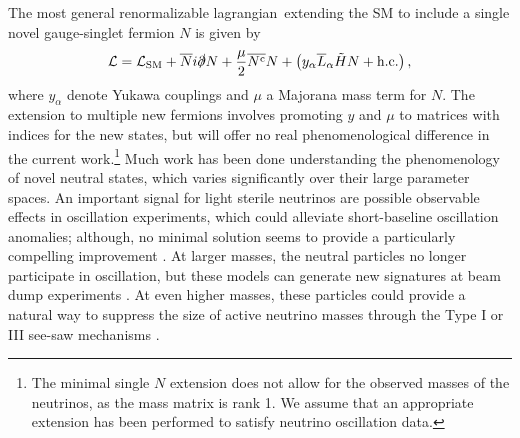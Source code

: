 \documentclass[11pt, a4paper]{article}
\def\lagrangian{lagrangian}
\begin{document}
The most general renormalizable \lagrangian\ extending the SM to include a
single novel gauge-singlet fermion $N$ is given by
%
\begin{align}   \mathcal{L} = \mathcal{L}_\text{SM} +
\overline{N}i\slashed{\partial}N+ \frac{\mu}{2} \overline{N^\text{c}}N  +
\left( y_\alpha\overline{L}_\alpha\tilde{H} N
+\text{h.c.}\right),\label{eq:minimallag} \end{align}
%
where $y_\alpha$ denote Yukawa couplings and $\mu$ a Majorana mass term for
$N$. The extension to multiple new fermions involves promoting $y$ and $\mu$ to
matrices with indices for the new states, but will offer no real
phenomenological difference in the current work.\footnote{The minimal single
$N$ extension does not allow for the observed masses of the neutrinos, as the
mass matrix is rank 1. We assume that an appropriate extension has been
performed to satisfy neutrino oscillation data.} Much work has been done
understanding the phenomenology of novel neutral states, which varies
significantly over their large parameter spaces. An important signal for light
sterile neutrinos are possible observable effects in oscillation experiments,
which could alleviate short-baseline oscillation anomalies; although, no
minimal solution seems to provide a particularly compelling improvement
\cite{}. At larger masses, the neutral particles no longer participate in
oscillation, but these models can generate new signatures at beam dump
experiments \cite{}. At even higher masses, these particles could provide a
natural way to suppress the size of active neutrino masses through the Type I
or III see-saw mechanisms \cite{}. 
\end{document}

